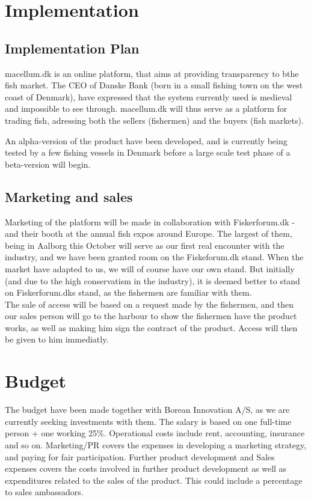 \documentclass[12pt]{article}
\begin{document}
\cleardoublepage
\section{Implementation}
\subsection{Implementation Plan}
macellum.dk is an online platform, that aims at providing transparency to bthe fish market. The CEO of Danske Bank (born in a small fishing town on the west coast of Denmark), have expressed that the system currently used is medieval and impossible to see through. macellum.dk will thus serve as a platform for trading fish, adressing both the sellers (fishermen) and the buyers (fish markets).  

An alpha-version of the product have been developed, and is currently being tested by a few fishing vessels in Denmark before a large scale test phase of a beta-version will begin. 

\subsection{Marketing and sales}
Marketing of the platform will be made in collaboration with Fiskerforum.dk - and their booth at the annual fish expos around Europe. The largest of them, being in Aalborg this October will serve as our first real encounter with the industry, and we have been granted room on the Fiskeforum.dk stand. When the market have adapted to us, we will of course have our own stand. But initially (and due to the high conservatism in the industry), it is deemed better to stand on Fiskerforum.dks stand, as the fishermen are familiar with them.\\

The sale of access will be based on a request made by the fishermen, and then our sales person will go to the harbour to show the fishermen have the product works, as well as making him sign the contract of the product. Access will then be given to him immediatly. 

\cleardoublepage
\section{Budget}
\label{sec:budget}
The budget have been made together with Borean Innovation A/S, as we are currently seeking investments with them. The salary is based on one full-time person + one working 25\%. Operational costs include rent, accounting, insurance and so on. Marketing/PR covers the expenses in developing a marketing strategy, and paying for fair participation. Further product development and Sales expenses covers the costs involved in further product development as well as expenditures related to the sales of the product. This could include a percentage to sales ambassadors.\\
\end{document}
